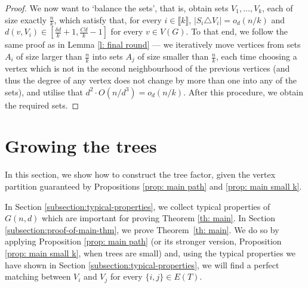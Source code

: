\documentclass[notitlepage]{scrartcl}
\newcommand{\br}[1]{\llbracket{#1}\rrbracket}
\begin{document}
\begin{proof}[Proof]
We now want to `balance the sets', that is, obtain sets $V_1,\ldots, V_k$, each of size exactly $\frac{n}{k}$, which satisfy that, for every $i\in\br{k}$, $\left|S_i\triangle V_i\right|=o_d(n/k)$ and $d(v,V_i)\in \left[\frac{\delta d}{k}+1,\frac{Cd}{k}-1\right]$ for every $v\in V(G)$. To that end, we follow the same proof as in Lemma \ref{l: final round} --- we iteratively move vertices from sets $A_i$ of size larger than $\frac{n}{k}$ into sets $A_j$ of size smaller than $\frac{n}{k}$, each time choosing a vertex which is not in the second neighbourhood of the previous vertices (and thus the degree of any vertex does not change by more than one into any of the sets), and utilise that $d^2\cdot O(n/d^3)=o_d(n/k)$. After this procedure, we obtain the required sets.
\end{proof}

\section{Growing the trees}\label{s: theorems proof}
In this section, we show how to construct the tree factor, given the vertex partition guaranteed by Propositions \ref{prop: main path} and \ref{prop: main small k}. 

In Section \ref{subsection:typical-properties}, we collect typical properties of $G(n, d)$ which are important for proving Theorem \ref{th: main}. In Section \ref{subsection:proof-of-main-thm}, we prove Theorem~\ref{th: main}. We do so by applying Proposition \ref{prop: main path} (or its stronger version, Proposition \ref{prop: main small k}, when trees are small) and, using the typical properties we have shown in Section \ref{subsection:typical-properties}, we will find a perfect matching between $V_i$ and $V_j$ for every $\{i,j\} \in E(T)$.
\end{document}
